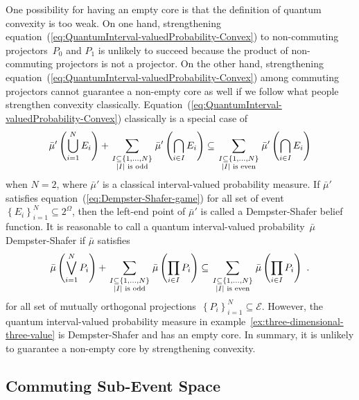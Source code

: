 \documentclass[12pt]{iopart}
\theoremstyle{plain}
\theoremstyle{definition}
\newcommand{\events}{\ensuremath{\mathcal{E}}}
\begin{document}
One possibility for having an empty core is that the definition of
quantum convexity is too weak. On one hand, strengthening equation~(\ref{eq:QuantumInterval-valuedProbability-Convex})
to non-commuting projectors~$P_{0}$ and $P_{1}$ is unlikely to
succeed because the product of non-commuting projectors is not a projector.
On the other hand, strengthening equation~(\ref{eq:QuantumInterval-valuedProbability-Convex})
among commuting projectors cannot guarantee a non-empty core as well
if we follow what people strengthen convexity classically. Equation~(\ref{eq:QuantumInterval-valuedProbability-Convex})
classically is a special case of 
\begin{equation}
\bar{\mu}'\left(\bigcup_{i=1}^{N}E_{i}\right)+\sum_{{{\scriptstyle I\subseteq\left\{ 1,\ldots,N\right\} }\atop {\scriptstyle \left|I\right|\textrm{ is odd}}}}\bar{\mu}'\left(\bigcap_{i\in I}E_{i}\right)\subseteq\sum_{{{\scriptstyle I\subseteq\left\{ 1,\ldots,N\right\} }\atop {\scriptstyle \left|I\right|\textrm{ is even}}}}\bar{\mu}'\left(\bigcap_{i\in I}E_{i}\right)\label{eq:Dempster-Shafer-game}
\end{equation}
when $N=2$, where $\bar{\mu}'$ is a classical interval-valued probability
measure. If $\bar{\mu}'$ satisfies equation~(\ref{eq:Dempster-Shafer-game})
for all set of event~$\left\{ E_{i}\right\} _{i=1}^{N}\subseteq2^{\Omega}$,
then the left-end point of $\bar{\mu}'$ is called a Dempster-Shafer
belief function. It is reasonable to call a quantum interval-valued
probability~$\bar{\mu}$ Dempster-Shafer if $\bar{\mu}$ satisfies
\begin{equation}
\bar{\mu}\left(\bigvee_{i=1}^{N}P_{i}\right)+\sum_{{{\scriptstyle I\subseteq\left\{ 1,\ldots,N\right\} }\atop {\scriptstyle \left|I\right|\textrm{ is odd}}}}\bar{\mu}\left(\prod_{i\in I}P_{i}\right)\subseteq\sum_{{{\scriptstyle I\subseteq\left\{ 1,\ldots,N\right\} }\atop {\scriptstyle \left|I\right|\textrm{ is even}}}}\bar{\mu}\left(\prod_{i\in I}P_{i}\right)\textrm{ .}\label{eq:Dempster-Shafer-game-quantum}
\end{equation}
for all set of mutually orthogonal projections~$\left\{ P_{i}\right\} _{i=1}^{N}\subseteq\events$.
However, the quantum interval-valued probability measure in example~\ref{ex:three-dimensional-three-value}
is Dempster-Shafer and has an empty core. In summary, it is unlikely
to guarantee a non-empty core by strengthening convexity.

\subsection{Commuting Sub-Event Space}
\end{document}
